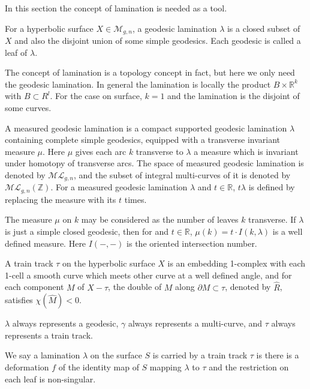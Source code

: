  
 In this section the concept of lamination is needed  as a tool. 
 

 For a hyperbolic surface $X\in \mathscr{M}_{g,n}$, a geodesic lamination $\lambda$ is a closed  subset of $X$ and also the disjoint union of some simple geodesics.  Each geodesic is called a leaf of  $\lambda$.

 
 \begin{remark}
 The concept of lamination is  a topology concept  in fact, but here we only need the geodesic lamination. In general the  lamination is locally the product $B\times \mathbb{R}^k$ with $B\subset R^l$. For the case on surface, $k=1$ and the lamination is the disjoint of some curves.
 \end{remark}
 

 A measured geodesic lamination  is a compact supported geodesic lamination $\lambda$ containing complete simple geodesics, equipped with a transverse invariant measure $\mu$.  Here $\mu$ gives each arc $k$ transverse to $\lambda$ a measure which is invariant under homotopy  of transverse arcs.  The space of measured geodesic lamination is denoted by $\mathscr{ML}_{g,n}$, and the subset of integral multi-curves of it is denoted by $\mathscr{ML}_{g,n}(\mathbb{Z})$. For a measured geodesic  lamination $\lambda$ and $t\in \mathbb{R}$, $t\lambda$ is defined by replacing the measure with its $t$ times.

 
 \begin{remark}
The measure $\mu$ on $k$ may be considered as the number of leaves  $k$ transverse.  If $\lambda$ is just a simple closed geodesic, then for and $t\in \mathbb{R}$, $\mu(k)=t\cdot I(k,\lambda)$ is a well defined measure. Here $I(-,-)$ is the oriented intersection number.
 \end{remark}
 
 A train track $\tau$ on the hyperbolic surface $X$ is an embedding 1-complex  with each 1-cell  a smooth curve  which meets  other curve at a well defined angle, and for each component $M$ of $X-\tau$, the double of $M$ along $\partial M\subset \tau$, denoted by $\hat{R}$, satisfies $\chi(\hat{M})<0$. 
 
 $\lambda$ always represents a geodesic,  $\gamma$ always represents a multi-curve, and $\tau$ always represents a train track.

We say a lamination $\lambda$ on the surface $S$ is carried by a train track $\tau$ is there is a deformation $f$ of the identity map of $S$ mapping $\lambda$ to $\tau$ and the restriction  on each leaf is non-singular. 


